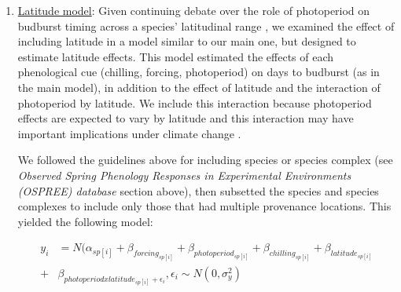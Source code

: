 \documentclass{article}
\begin{document}
\begin{enumerate}
\item \underline{Latitude model}:
Given continuing debate over the role of photoperiod on budburst timing across a species' latitudinal range  \citep[e.g.,][]{Zohner2016,Gauzere2017}, we examined the effect of including latitude in a model similar to our main one, but designed to estimate latitude effects. This model estimated the effects of each phenological cue (chilling, forcing, photoperiod) on days to budburst (as in the main model), in addition to the effect of latitude and the interaction of photoperiod by latitude. We include this interaction because photoperiod effects are expected to vary by latitude and this interaction may have important implications under climate change \citep{Saikkonen2012,Way2015,Gauzere2017}.
\par We followed the guidelines above for including species or species complex (see \emph{Observed Spring Phenology Responses in Experimental Environments (OSPREE) database} section above), then subsetted the species and species complexes to include only those that had multiple provenance locations. This yielded the following model:

\begin{align*}
y_i &= N(\alpha_{sp[i]} + \beta_{forcing_{sp[i]}} + \beta_{photoperiod_{sp[i]}} + \beta_{chilling_{sp[i]}} + \beta_{latitude_{sp[i]}} \\+& \beta_{photoperiod x latitude_{sp[i]} + \epsilon_i},\epsilon_i \sim N(0,\sigma^2_y)
\end{align*}


\end{enumerate}
\end{document}
